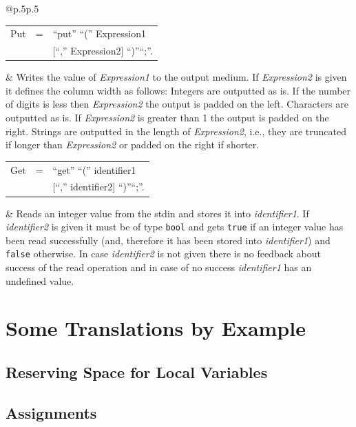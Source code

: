 \documentclass[11pt]{report}
\newenvironment{grammar}[2] %
	{
		\newcommand{\completerule}[2]{##1 & = & ##2.\\}
		\newcommand{\startrule}[2]{##1 & = & ##2\\}
		\newcommand{\alternativerule}[1]{ & $|$ & ##1\\}
		\newcommand{\alternativeend}[1]{ & $|$ & ##1.\\}
		\newcommand{\finishrule}[1]{ & & ##1.\\}
		\begin{tabular}{p{#1} c p{#2}}
	}
	{	\end{tabular}
	}
\begin{document}
\noindent \begin{tabular}{@{}p{}p{}}

\begin{grammar}{}{}
	\startrule{Put}{``put'' ``('' Expression1}
	\finishrule {[``,'' Expression2] ``)''``;''}
\end{grammar}
&
Writes the value of {\em Expression1} to the output medium. If {\em Expression2} is given it defines the column width as follows: Integers are outputted as is. If the number of digits is less then {\em Expression2} the output is padded on the left. Characters are outputted as is. If {\em Expression2} is greater than 1 the output is padded on the right. Strings are outputted in the length of {\em Expression2}, i.e., they are truncated if longer than {\em Expression2} or padded on the right if shorter. \\

\begin{grammar}{}{}
	\startrule{Get}{``get'' ``('' identifier1}
	\finishrule {[``,'' identifier2] ``)''``;''}
\end{grammar}
&
Reads an integer value from the stdin and stores it into {\em identifier1}. If {\em identifier2} is given it must be of type \lstinline$bool$ and gets \lstinline$true$ if an integer value has been read successfully (and, therefore it has been stored into {\em identifier1}) and \lstinline$false$ otherwise. In case {\em identifier2} is not given there is no feedback about success of the read operation and in case of no success {\em identifier1} has an undefined value.
\end{tabular}

\chapter{Some Translations by Example}
\lstset{language=NoBeardAsm}
\section{Reserving Space for Local Variables}

\section{Assignments}
\end{document}
